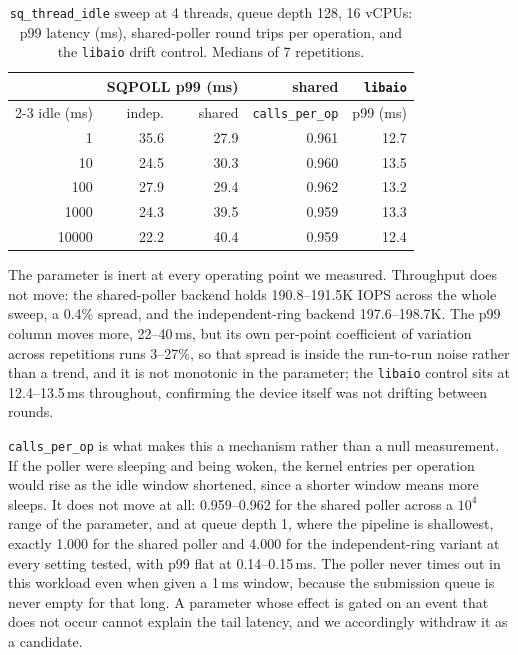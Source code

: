 \documentclass[conference]{IEEEtran}
\begin{document}
\begin{table}[t]
\centering
\caption{\texttt{sq\_thread\_idle} sweep at 4 threads, queue depth 128, 16 vCPUs: p99 latency
(ms), shared-poller round trips per operation, and the \texttt{libaio} drift control. Medians of
7 repetitions.}
\label{tab:idle-sweep}
\begin{tabular}{rrrrr}
\toprule
& \multicolumn{2}{c}{SQPOLL p99 (ms)} & shared & \texttt{libaio} \\
\cmidrule(lr){2-3}
idle (ms) & indep. & shared & \texttt{calls\_per\_op} & p99 (ms) \\
\midrule
1      & 35.6 & 27.9 & 0.961 & 12.7 \\
10     & 24.5 & 30.3 & 0.960 & 13.5 \\
100    & 27.9 & 29.4 & 0.962 & 13.2 \\
1000   & 24.3 & 39.5 & 0.959 & 13.3 \\
10000  & 22.2 & 40.4 & 0.959 & 12.4 \\
\bottomrule
\end{tabular}
\end{table}

The parameter is inert at every operating point we measured. Throughput does not move: the
shared-poller backend holds 190.8--191.5K IOPS across the whole sweep, a 0.4\% spread, and the
independent-ring backend 197.6--198.7K. The p99 column moves more, 22--40\,ms, but its own
per-point coefficient of variation across repetitions runs 3--27\%, so that spread is inside the
run-to-run noise rather than a trend, and it is not monotonic in the parameter; the
\texttt{libaio} control sits at 12.4--13.5\,ms throughout, confirming the device itself was not
drifting between rounds.

\texttt{calls\_per\_op} is what makes this a mechanism rather than a null measurement. If the
poller were sleeping and being woken, the kernel entries per operation would rise as the idle
window shortened, since a shorter window means more sleeps. It does not move at all: 0.959--0.962
for the shared poller across a $10^4$ range of the parameter, and at queue depth 1, where the
pipeline is shallowest, exactly 1.000 for the shared poller and 4.000 for the independent-ring
variant at every setting tested, with p99 flat at 0.14--0.15\,ms. The poller never times out in
this workload even when given a 1\,ms window, because the submission queue is never empty for
that long. A parameter whose effect is gated on an event that does not occur cannot explain the
tail latency, and we accordingly withdraw it as a candidate.
\end{document}
